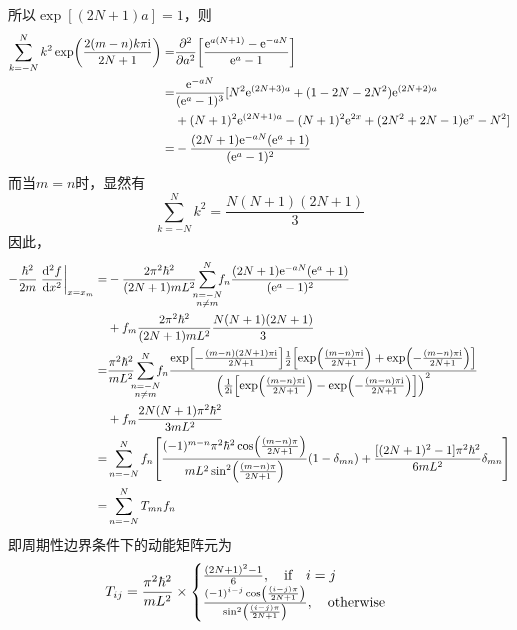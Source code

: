 \documentclass[UTF8,12pt]{article}
\begin{document}
        所以$\exp[(2N+1)a]=1$，则
        \begin{align}
            \sum_{k=-N}^N{k^2\exp(\frac{2(m-n)k\pi\mathrm{i}}{2N+1})}=&\pdv[2]{a} \qty[\frac{\mathrm{e}^{a(N+1)}-\mathrm{e}^{-aN}}{\mathrm{e}^{a}-1}] \\
            =&\frac{\mathrm{e}^{-aN}}{(\mathrm{e}^{a}-1)^3}[N^2\mathrm{e}^{(2N+3)a}+(1-2N-2N^2)\mathrm{e}^{(2N+2)a} \nonumber \\
            &+(N+1)^2\mathrm{e}^{(2N+1)a}-(N+1)^2\mathrm{e}^{2x}+(2N^2+2N-1)\mathrm{e}^{x}-N^2] \\
            =&-\frac{(2N+1)\mathrm{e}^{-aN}(\mathrm{e}^{a}+1)}{(\mathrm{e}^{a}-1)^2}
        \end{align}
        而当$m=n$时，显然有
        \begin{equation}
            \sum_{k=-N}^N{k^2}=\frac{N(N+1)(2N+1)}{3}
        \end{equation}
        因此，
        \begin{align}
            -\frac{\hbar^2}{2m}\eval{\dv[2]{f}{x}}_{x=x_m}=&-\frac{2\pi^2\hbar^2}{(2N+1)mL^2}\sum_{\mathclap{\substack{n=-N\\n\neq m}}}^N{f_n\frac{(2N+1)\mathrm{e}^{-aN}(\mathrm{e}^{a}+1)}{(\mathrm{e}^{a}-1)^2}} \nonumber \\
            &+f_m\frac{2\pi^2\hbar^2}{(2N+1)mL^2}\frac{N(N+1)(2N+1)}{3} \\
            =&\frac{\pi^2\hbar^2}{mL^2}\sum_{\mathclap{\substack{n=-N\\n\neq m}}}^N{f_n\frac{\exp[-\frac{(m-n)(2N+1)\pi\mathrm{i}}{2N+1}]\frac{1}{2}\qty[\exp(\frac{(m-n)\pi\mathrm{i}}{2N+1})+\exp(-\frac{(m-n)\pi\mathrm{i}}{2N+1})]}{\qty(\frac{1}{2\mathrm{i}}\qty[\exp(\frac{(m-n)\pi\mathrm{i}}{2N+1})-\exp(-\frac{(m-n)\pi\mathrm{i}}{2N+1})])^2}} \nonumber \\
            &+f_m\frac{2N(N+1)\pi^2\hbar^2}{3mL^2} \\
            =&\sum_{n=-N}^N{f_n\qty[\frac{(-1)^{m-n}\pi^2\hbar^2\cos(\frac{(m-n)\pi}{2N+1})}{mL^2\sin[2](\frac{(m-n)\pi}{2N+1})}(1-\delta_{mn})+\frac{[(2N+1)^2-1]\pi^2\hbar^2}{6mL^2}\delta_{mn}]} \\
            =&\sum_{n=-N}^N{T_{mn}f_n}
        \end{align}
        即周期性边界条件下的动能矩阵元为
        \begin{equation}
            T_{ij}=\frac{\pi^2\hbar^2}{mL^2}\times\begin{cases}
                \frac{(2N+1)^2-1}{6},\qif i=j \\
                \frac{(-1)^{i-j}\cos(\frac{(i-j)\pi}{2N+1})}{\sin[2](\frac{(i-j)\pi}{2N+1})},\qotherwise
            \end{cases}
        \end{equation}
\end{document}
